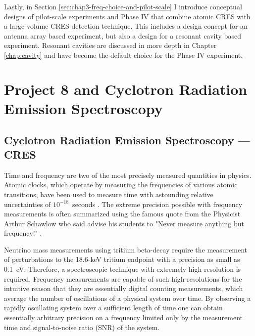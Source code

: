 Lastly, in Section \ref{sec:chap3-freq-choice-and-pilot-scale} I introduce conceptual designs of pilot-scale experiments and Phase IV that combine atomic CRES with a large-volume CRES detection technique. This includes a design concept for an antenna array based experiment, but also a design for a resonant cavity based experiment. Resonant cavities are discussed in more depth in Chapter \ref{chap:cavity} and have become the default choice for the Phase IV experiment.

\section{Project 8 and Cyclotron Radiation Emission Spectroscopy}
\label{sec:chap3-cres-and-p8}

\subsection{Cyclotron Radiation Emission Spectroscopy --- CRES}
\label{sec:chap3-cres}

Time and frequency are two of the most precisely measured quantities in physics. %
Atomic clocks, which operate by measuring the frequencies of various atomic transitions, have been used to measure time with astounding relative uncertainties of $10^{-18}$~seconds \cite{atomic_clock}. The extreme precision possible with frequency measurements is often summarized using the famous quote from the Physicist Arthur Schawlow who said advise his students to "Never measure anything but frequency!" \cite{never_meas_anything_but_freq}. 

Neutrino mass measurements using tritium beta-decay require the measurement of perturbations to the 18.6-keV tritium endpoint with a precision as small as 0.1~eV. Therefore, a spectroscopic technique with extremely high resolution is required. Frequency measurements are capable of such high-resolutions for the intuitive reason that they are essentially digital counting measurements, which average the number of oscillations of a physical system over time. By observing a rapidly oscillating system over a sufficient length of time one can obtain essentially arbitrary precision on a frequency limited only by the measurement time and signal-to-noise ratio (SNR) of the system.


